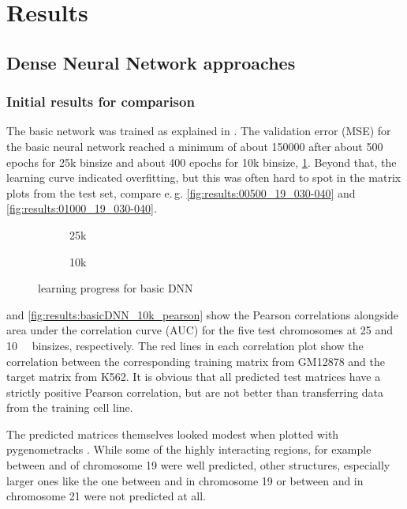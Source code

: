 \section{Results}
\subsection{Dense Neural Network approaches} 

\subsubsection{Initial results for comparison} \label{sec:initialDNNresults}
The basic network was trained as explained in \xxx.
The validation error (MSE) for the basic neural network reached a minimum of about \SI{150000}{} 
after about 500 epochs for 25k binsize and about 400 epochs for 10k binsize, \cref{fig:results:basicDNN_lossEpochs}.
Beyond that, the learning curve indicated overfitting, but this was often hard to spot in the matrix plots from the test set, 
compare e.\,g. \cref{fig:results:00500_19_030-040} and \ref{fig:results:01000_19_030-040}.
\begin{figure}[hbp]
 \begin{subfigure}{0.45\textwidth}
 \caption{25k}
 \end{subfigure}\hfill
 \begin{subfigure}{0.45\textwidth}
 \caption{10k}
 \end{subfigure}
 \caption{learning progress for basic DNN} \label{fig:results:basicDNN_lossEpochs}
\end{figure}


 and \cref{fig:results:basicDNN_10k_pearson} show the Pearson correlations alongside area under the correlation curve (AUC) for the five test chromosomes
at 25 and \SI{10}{\kilo\bp} binsizes, respectively.
The red lines in each correlation plot show the correlation between the corresponding training matrix from GM12878 and the target matrix from K562.
It is obvious that all predicted test matrices have a strictly positive Pearson correlation, but are not better than transferring data from the training cell line.

The predicted matrices themselves looked modest when plotted with pygenometracks \xxx. 
While some of the highly interacting regions, for example between \xxx and \xxx of chromosome 19 were
well predicted, other structures, especially larger ones like the one between \xxx and \xxx in chromosome 19 
or between \xxx and \xxx in chromosome 21 were not predicted at all.

